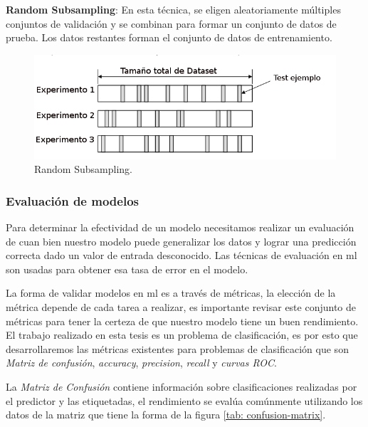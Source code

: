 \par \textbf{Random Subsampling}: En esta técnica, se eligen aleatoriamente múltiples conjuntos de validación y se combinan para formar un conjunto de datos de prueba. Los datos restantes forman el conjunto de datos de entrenamiento.

\begin{figure}[H]
 \centering
  \includegraphics[scale=0.5,keepaspectratio=true,clip=true]{imagenes/MarcoTeorico/cross-validation-random.png}
  \caption{Random Subsampling.}%
	\label{Fig: random-Subsampling}
\end{figure}


\subsubsection{Evaluación de modelos}\label{sub:evaluación-modelo}
Para determinar la efectividad de un modelo necesitamos realizar un evaluación de cuan bien nuestro modelo puede generalizar los datos y lograr una predicción correcta dado un valor de entrada desconocido. Las técnicas de evaluación en \ac{ml} son usadas para obtener esa tasa de error en el modelo. 

La forma de validar modelos en \ac{ml} es a través de métricas, la elección de la métrica depende de cada tarea a realizar, es importante revisar este conjunto de métricas para tener la certeza de que nuestro modelo tiene un buen rendimiento. El trabajo realizado en esta tesis es un problema de clasificación, es por esto que desarrollaremos las métricas existentes para problemas de clasificación que son \textit{Matriz de confusión}, \textit{accuracy}, \textit{precision}, \textit{recall} y \textit{curvas ROC}.

La \textit{Matriz de Confusión} contiene información sobre clasificaciones realizadas por el predictor y las etiquetadas, el rendimiento  se evalúa comúnmente utilizando los datos de la matriz que tiene la forma de la figura \ref{tab: confusion-matrix}.

